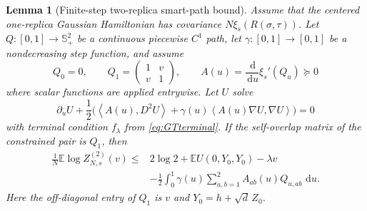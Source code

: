 \documentclass[11pt]{article}
\numberwithin{equation}{section}
\theoremstyle{plain}
\newtheorem{lemma}[theorem]{Lemma}
\theoremstyle{definition}
\newcommand{\E}{\mathbb E}
\newcommand{\1}{\mathbf 1}
\newcommand{\dd}{\,\mathrm d}
\newcommand{\ip}[2]{\left\langle #1,#2\right\rangle}
\begin{document}
\begin{lemma}[Finite-step two-replica smart-path bound]
\label{lem:specialGT}
Assume that the centered one-replica Gaussian Hamiltonian has covariance
$N\xi_s(R(\sigma,\tau))$.  Let
$Q:[0,1]\to\mathbb S_+^2$ be a continuous piecewise $C^1$ path, let
$\gamma:[0,1]\to[0,1]$ be a nondecreasing step function, and
assume
\begin{equation}
 Q_0=0,\qquad Q_1=
 \begin{pmatrix}1&v\\v&1\end{pmatrix},
 \qquad
 A(u)=\frac{\dd}{\dd u}\xi_s'(Q_u)\succeq0
 \label{eq:GTlemmaassumptions}
\end{equation}
where scalar functions are applied entrywise.  Let $U$ solve
\[
 \partial_uU+\frac12\bigl(\ip{A(u)}{D^2U}
 +\gamma(u)\ip{A(u)\nabla U}{\nabla U}\bigr)=0
\]
with terminal condition $f_\lambda$ from \eqref{eq:GTterminal}.  If the
self-overlap matrix of the constrained pair is $Q_1$, then
\begin{align}
 \frac1N\E\log Z^{(2)}_{N,s}(v)
 \le{}&2\log2+\E U(0,Y_0,Y_0)-\lambda v\nonumber\\
 &-\frac12\int_0^1\gamma(u)
 \sum_{a,b=1}^2A_{ab}(u)Q_{u,ab}\,\dd u.
 \label{eq:specialGTlemma}
\end{align}
Here the off-diagonal entry of $Q_1$ is $v$ and
$Y_0=h+\sqrt d\,Z_0$.
\end{lemma}
\end{document}
